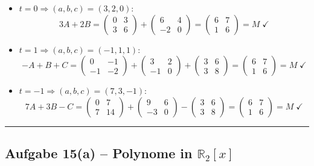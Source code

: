 \documentclass[a4paper,12pt]{article}
\begin{document}
\begin{itemize}[leftmargin=*]
\item $t = 0 \Rightarrow (a,b,c) = (3, 2, 0)$:
\[
3A + 2B = \begin{pmatrix} 0 & 3 \\ 3 & 6 \end{pmatrix} + \begin{pmatrix} 6 & 4 \\ -2 & 0 \end{pmatrix}
= \begin{pmatrix} 6 & 7 \\ 1 & 6 \end{pmatrix} = M \;\checkmark
\]

\item $t = 1 \Rightarrow (a,b,c) = (-1, 1, 1)$:
\[
-A + B + C = \begin{pmatrix} 0 & -1 \\ -1 & -2 \end{pmatrix} + \begin{pmatrix} 3 & 2 \\ -1 & 0 \end{pmatrix} + \begin{pmatrix} 3 & 6 \\ 3 & 8 \end{pmatrix}
= \begin{pmatrix} 6 & 7 \\ 1 & 6 \end{pmatrix} = M \;\checkmark
\]

\item $t = -1 \Rightarrow (a,b,c) = (7, 3, -1)$:
\[
7A + 3B - C = \begin{pmatrix} 0 & 7 \\ 7 & 14 \end{pmatrix} + \begin{pmatrix} 9 & 6 \\ -3 & 0 \end{pmatrix} - \begin{pmatrix} 3 & 6 \\ 3 & 8 \end{pmatrix}
= \begin{pmatrix} 6 & 7 \\ 1 & 6 \end{pmatrix} = M \;\checkmark
\]
\end{itemize}

\bigskip
\hrule
\bigskip

\subsection*{Aufgabe 15(a) -- Polynome in $\mathbb{R}_2[x]$}
\end{document}

